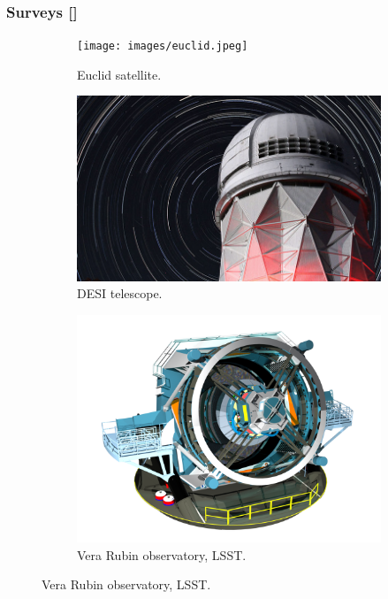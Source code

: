 \documentclass{beamer}
\makeatletter
\newcommand{\mylabel}{%
   [\beamer@againname]}
\makeatother
\begin{document}
\begin{frame}[plain,label=surveys]
    \frametitle{Surveys\mylabel}
    \begin{figure}
    	\centering
	\begin{subfigure}{0.29\textwidth}
        \texttt{[image: images/euclid.jpeg]}
	\caption{Euclid satellite.}
	\end{subfigure}
	\hfill
	\begin{subfigure}{0.4\textwidth}
        \includegraphics[width=\textwidth]{images/desi.png}
	\caption{DESI telescope.}
	\end{subfigure}
	\hfill
	\begin{subfigure}{0.39\textwidth}
        \includegraphics[width=\textwidth]{images/lsst.png}
	\caption{Vera Rubin observatory, LSST.}
	\end{subfigure}
    \end{figure}
\end{frame}
\end{document}
